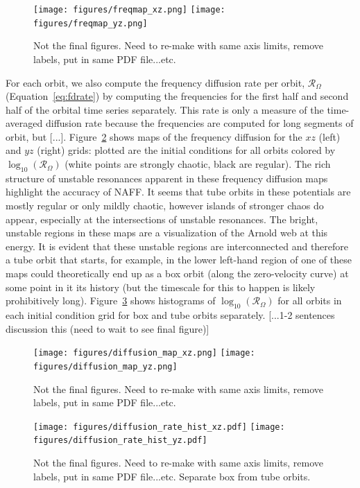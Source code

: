 \documentclass[letterpaper,12pt,preprint]{aastex}
\newcommand{\fdrate}{\mathcal{R}_\Omega}
\begin{document}
\begin{figure}[h]
\centering
	\texttt{[image: figures/freqmap\_xz.png]}
	\texttt{[image: figures/freqmap\_yz.png]}
	\caption{Not the final figures. Need to re-make with same axis limits, remove labels, put in same PDF file...etc.} 
	\label{fig:freqmap}
\end{figure}

For each orbit, we also compute the frequency diffusion rate per orbit, $\fdrate$ (Equation~\ref{eq:fdrate}) by computing the frequencies for the first half and second half of the orbital time series separately. This rate is only a measure of the time-averaged diffusion rate because the frequencies are computed for long segments of orbit, but \cite{valluri??} [...]. Figure~\ref{fig:diffusionmap} shows maps of the frequency diffusion for the $xz$ (left) and $yz$ (right) grids: plotted are the initial conditions for all orbits colored by $\log_{10}(\fdrate)$ (white points are strongly chaotic, black are regular). The rich structure of unstable resonances apparent in these frequency diffusion maps highlight the accuracy of NAFF. It seems that tube orbits in these potentials are mostly regular or only mildly chaotic, however islands of stronger chaos do appear, especially at the intersections of unstable resonances. The bright, unstable regions in these maps are a visualization of the Arnold web at this energy. It is evident that these unstable regions are interconnected and therefore a tube orbit that starts, for example, in the lower left-hand region of one of these maps could  theoretically end up as a box orbit (along the zero-velocity curve) at some point in it its history (but the timescale for this to happen is likely prohibitively long). Figure~\ref{fig:diffusionrates} shows histograms of $\log_{10}(\fdrate)$ for all orbits in each initial condition grid for box and tube orbits separately. [...1-2 sentences discussion this (need to wait to see final figure)]

\begin{figure}[h]
\centering
	\texttt{[image: figures/diffusion\_map\_xz.png]}
	\texttt{[image: figures/diffusion\_map\_yz.png]}
	\caption{Not the final figures. Need to re-make with same axis limits, remove labels, put in same PDF file...etc.} 
	\label{fig:diffusionmap}
\end{figure}

\begin{figure}[h]
\centering
	\texttt{[image: figures/diffusion\_rate\_hist\_xz.pdf]}
	\texttt{[image: figures/diffusion\_rate\_hist\_yz.pdf]}
	\caption{Not the final figures. Need to re-make with same axis limits, remove labels, put in same PDF file...etc. Separate box from tube orbits.} 
	\label{fig:diffusionrates}
\end{figure}
\end{document}
